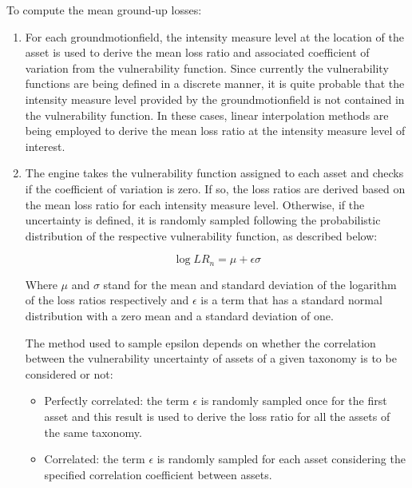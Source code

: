 To compute the mean ground-up losses:

\begin{enumerate}
\item For each \gls{groundmotionfield}, the intensity measure level at the location of the \gls{asset} is used to derive the mean loss ratio and associated coefficient of variation from the \gls{vulnerability function}. Since currently the \glspl{vulnerability function} are being defined in a discrete manner, it is quite probable that the intensity measure level provided by the \gls{groundmotionfield} is not contained in the \gls{vulnerability function}. In these cases, linear interpolation methods are being employed to derive the mean loss ratio at the intensity measure level of interest. 

\item The engine takes the \gls{vulnerability function} assigned to each \gls{asset} and checks if the coefficient of variation is zero. If so, the loss ratios are derived based on the mean loss ratio for each intensity measure level. Otherwise, if the uncertainty is defined, it is randomly sampled following the probabilistic distribution of the respective \gls{vulnerability function}, as described below:

\begin{equation}
\log{LR_n} = \mu + \epsilon\sigma
\end{equation}

Where $\mu$ and $\sigma$ stand for the mean and standard deviation of the logarithm of the loss ratios respectively and $\epsilon$ is a term that has a standard normal distribution with a zero mean and a standard deviation of one.  

The method used to sample epsilon depends on whether the correlation between the vulnerability uncertainty of \glspl{asset} of a given \gls{taxonomy} is to be considered or not:

\begin{itemize}

\item Perfectly correlated: the term $\epsilon$ is randomly sampled once for the first \gls{asset} and this result is used to derive the loss ratio for all the \glspl{asset} of the same \gls{taxonomy}. 

\item Correlated: the term $\epsilon$ is randomly sampled for each \gls{asset} considering the specified correlation coefficient between \glspl{asset}. 


\end{itemize}
\end{enumerate}
